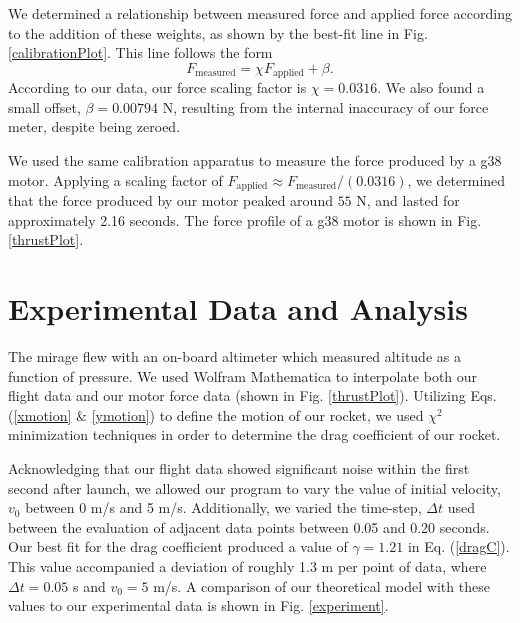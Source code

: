 \documentclass[aps,pra,twocolumn]{revtex4-1}
\begin{document}
We determined a relationship between measured force and applied force according to the addition of these weights, as shown by the best-fit line in Fig. \ref{calibrationPlot}.  This line follows the form
\begin{equation}
F_\text{measured} = \chi F_\text{applied} + \beta.
\end{equation}
According to our data, our force scaling factor is $\chi = 0.0316$.  We also found a small offset, $\beta = 0.00794$ N, resulting from the internal inaccuracy of our force meter, despite being zeroed.

We used the same calibration apparatus to measure the force produced by a g38 motor.  Applying a scaling factor of $F_\text{applied} \approx F_\text{measured}/(0.0316)$, we determined that the force produced by our motor peaked around $55$ N, and lasted for approximately 2.16 seconds.  The force profile of a g38 motor is shown in Fig. \ref{thrustPlot}.



\section{\label{section 4} Experimental Data and Analysis}
The mirage flew with an on-board altimeter which measured altitude as a function of pressure.  We used Wolfram Mathematica to interpolate both our flight data and our motor force data (shown in Fig. \ref{thrustPlot}).  Utilizing Eqs. (\ref{xmotion} \& \ref{ymotion}) to define the motion of our rocket, we used $\chi^2$ minimization techniques in order to determine the drag coefficient of our rocket.

Acknowledging that our flight data showed significant noise within the first second after launch, we allowed our program to vary the value of initial velocity, $v_0$ between 0 m/s and 5 m/s.  Additionally, we varied the time-step, $\Delta t$ used between the evaluation of adjacent data points between 0.05 and 0.20 seconds.  Our best fit for the drag coefficient produced a value of $\gamma =  1.21$ in Eq. (\ref{dragC}).  This value accompanied a deviation of roughly 1.3 m per point of data, where $\Delta t = 0.05$ s and $v_0 = 5$ m/s.  A comparison of our theoretical model with these values to our experimental data is shown in Fig. \ref{experiment}.
\end{document}
